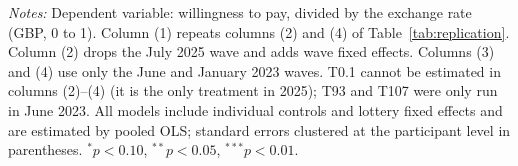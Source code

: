 \begin{table}[!t]
\smallskip
\begin{minipage}{0.97\textwidth}\footnotesize
\emph{Notes:} Dependent variable: willingness to pay, divided by the exchange rate (GBP, 0 to 1). Column (1) repeats columns (2) and (4) of Table~\ref{tab:replication}. Column (2) drops the July 2025 wave and adds wave fixed effects. Columns (3) and (4) use only the June and January 2023 waves. T0.1 cannot be estimated in columns (2)--(4) (it is the only treatment in 2025); T93 and T107 were only run in June 2023. All models include individual controls and lottery fixed effects and are estimated by pooled OLS; standard errors clustered at the participant level in parentheses. $^{*}p<0.10$, $^{**}p<0.05$, $^{***}p<0.01$.
\end{minipage}
\end{table}
